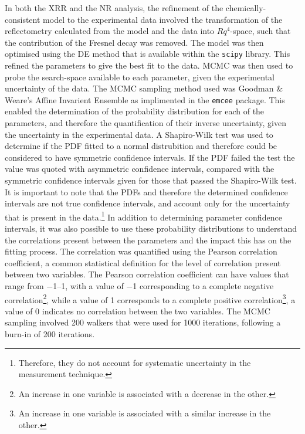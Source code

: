 In both the XRR and the NR analysis, the refinement of the chemically-consistent model to the experimental data involved the transformation of the reflectometry calculated from the model and the data into $Rq^4$-space, such that the contribution of the Fresnel decay was removed.\autocite{gerelli_aurore_2016}
The model was then optimised using the DE method that is available within the \texttt{scipy} library.\autocite{jones_scipy_nodate}
This refined the parameters to give the best fit to the data.
MCMC was then used to probe the search-space available to each parameter, given the experimental uncertainty of the data.
The MCMC sampling method used was Goodman \& Weare's Affine Invarient Ensemble\autocite{goodman_ensemble_2010} as implimented in the \texttt{emcee} package.\autocite{foreman-mackey_emcee_2013}
This enabled the determination of the probability distribution for each of the parameters, and therefore the quantification of their inverse uncertainty, given the uncertainty in the experimental data.
A Shapiro-Wilk test\autocite[this is a commonly test to assess the normality of a distribution]{shapiro_analysis_1965} was used to determine if the PDF fitted to a normal distrubition and therefore could be considered to have symmetric confidence intervals.
If the PDF failed the test the value was quoted with asymmetric confidence intervals, compared with the symmetric confidence intervals given for those that passed the Shapiro-Wilk test.
It is important to note that the PDFs and therefore the determined confidence intervals are not true confidence intervals, and account only for the uncertainty that is present in the data.\footnote{Therefore, they do not account for systematic uncertainty in the measurement technique.}
In addition to determining parameter confidence intervals, it was also possible to use these probability distributions to understand the correlations present between the parameters and the impact this has on the fitting process.
The correlation was quantified using the Pearson correlation coefficient\autocite{pearson_notes_1895}, a common statistical definition for the level of correlation present between two variables.
The Pearson correlation coefficient can have values that range from \numrange{-1}{1}, with a value of \num{-1} corresponding to a complete negative correlation\footnote{An increase in one variable is associated with a decrease in the other.}, while a value of \num{1} corresponds to a complete positive correlation\footnote{An increase in one variable is associated with a similar increase in the other.}, a value of \num{0} indicates no correlation between the two variables.
The MCMC sampling involved 200 walkers that were used for 1000 iterations, following a burn-in of 200 iterations.
